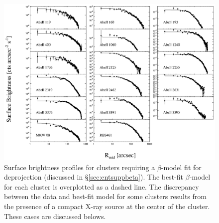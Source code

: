 \begin{figure}[htp]
  \begin{center}
    \begin{minipage}[htp]{0.9\linewidth}
      \includegraphics*[width=\textwidth, trim=15mm 10mm 10mm 10mm, clip]{beta.eps}
      \caption[Surface brightness profiles for clusters requiring a
        $\beta$-model fit for deprojection]{Surface brightness profiles for clusters requiring a
        $\beta$-model fit for deprojection (discussed in
        \S\ref{sec:entsuppbeta}). The best-fit $\beta$-model for each cluster
        is overplotted as a dashed line. The discrepancy between the
        data and best-fit model for some clusters results from the
        presence of a compact X-ray source at the center of the
        cluster. These cases are discussed belows.}
      \label{fig:betamods}
    \end{minipage}
  \end{center}
\end{figure}

